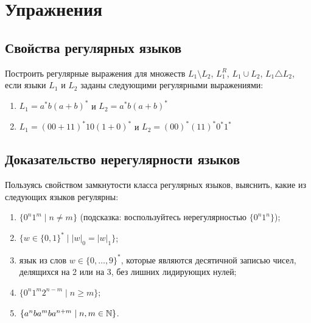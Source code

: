 \section{Упражнения}
\label{Chapter5Exs}
\subsection*{Свойства регулярных языков}
Построить регулярные выражения для множеств $L_1 \setminus L_2$, $L_1^R$, $L_1 \cup L_2$, $L_1 \triangle L_2$, если языки  $L_1$ и $L_2$ заданы следующими регулярными выражениями:
\begin{enumerate}
\item $L_1 = a^*b(a+b)^*$ и $L_2 = a^*b(a+b)^*$
\item $L_1 = (00 + 11)^*10(1 + 0)^*$ и $L_2=(00)^*(11)^*0^*1^*$
\end{enumerate}

\subsection*{Доказательство нерегулярности языков}
Пользуясь свойством замкнутости
класса регулярных языков, выяснить, какие из следующих языков регулярны:
\begin{enumerate}
  \item $\{0^n 1^m \mid n \neq m\}$ (подсказка: воспользуйтесь
  нерегулярностью $\{0^n1^n\}$);
  \item $\{ w \in \{0, 1\}^* \mid
  |w|_0 = |w|_1\}$;
  \item язык из слов $w \in \{0,\ldots, 9\}^*$, которые
  являются десятичной записью чисел, делящихся на 2 или на 3, без
  лишних лидирующих нулей;
  \item $\{ 0^n 1^m 2^{n-m} \mid n \geqslant m \}$;
  \item $\{ a^n b a^m b a^{n+m} \mid n, m \in \mathbb N \}$.
\end{enumerate}
%
